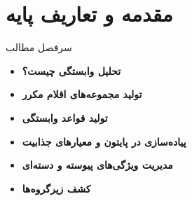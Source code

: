 \section{مقدمه و تعاریف پایه}

\begin{frame}[plain]
\titlepage
\end{frame}

\begin{frame}{سرفصل مطالب}{}
\begin{itemize}\setlength{\itemsep}{8pt}
    \item \textbf{تحلیل وابستگی چیست؟} 
    \item \textbf{تولید مجموعه‌های اقلام مکرر} 
    \item \textbf{تولید قواعد وابستگی} 
    \item \textbf{پیاده‌سازی در پایتون و معیارهای جذابیت} 
    \item \textbf{مدیریت ویژگی‌های پیوسته و دسته‌ای} 
    \item \textbf{کشف زیرگروه‌ها} 
\end{itemize}
\end{frame}

